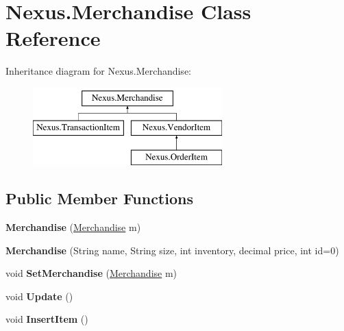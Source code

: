\hypertarget{class_nexus_1_1_merchandise}{}\section{Nexus.\+Merchandise Class Reference}
\label{class_nexus_1_1_merchandise}
Inheritance diagram for Nexus.\+Merchandise\+:\begin{figure}[H]
\begin{center}
\leavevmode
\includegraphics[height=3.000000cm]{class_nexus_1_1_merchandise}
\end{center}
\end{figure}
\subsection*{Public Member Functions}
\begin{DoxyCompactItemize}
\item 
\mbox{\label{class_nexus_1_1_merchandise_a7b70107e2bbf6638d71f2a02653963f8}} 
{\bfseries Merchandise} (\mbox{\hyperlink{class_nexus_1_1_merchandise}{Merchandise}} m)
\item 
\mbox{\label{class_nexus_1_1_merchandise_a0606f9f215e49a1c0823bf4afc7d7e28}} 
{\bfseries Merchandise} (String name, String size, int inventory, decimal price, int id=0)
\item 
\mbox{\label{class_nexus_1_1_merchandise_a520670a79a1c0c77de5530c45f751ef2}} 
void {\bfseries Set\+Merchandise} (\mbox{\hyperlink{class_nexus_1_1_merchandise}{Merchandise}} m)
\item 
\mbox{\label{class_nexus_1_1_merchandise_a0d85556de82cf65976a45026be1f4ec1}} 
void {\bfseries Update} ()
\item 
\mbox{\label{class_nexus_1_1_merchandise_a274386cb44b2d3728417fb93f2f1f349}} 
void {\bfseries Insert\+Item} ()
\end{DoxyCompactItemize}
